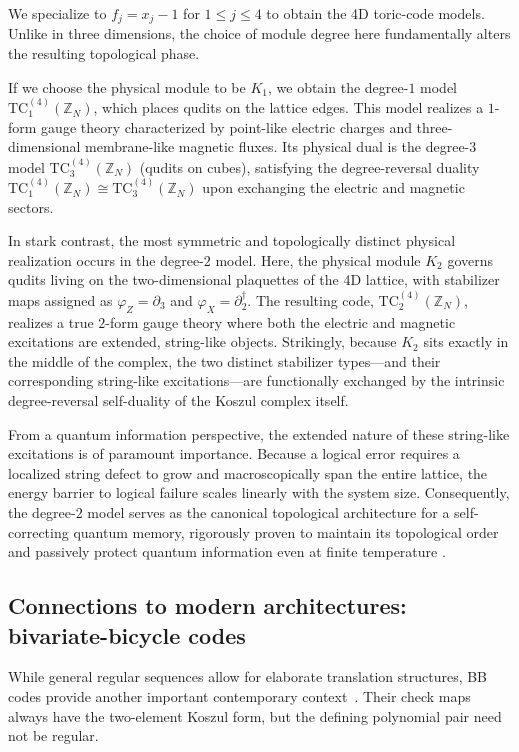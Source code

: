 \documentclass[aps,prx,english,superscriptaddress,twocolumn,tightenlines,showpacs,longbibliography,floatfix,amsfonts]{revtex4-2}
\theoremstyle{remark}
\theoremstyle{definition}
\begin{document}
We specialize to $f_j=x_j-1$ for $1\le j\le 4$ to obtain the 4D toric-code models. Unlike in three dimensions, the choice of module degree here fundamentally alters the resulting topological phase.

If we choose the physical module to be $K_1$, we obtain the degree-$1$ model $\mathrm{TC}_1^{(4)}(\mathbb{Z}_N)$, which places qudits on the lattice edges. This model realizes a $1$-form gauge theory characterized by point-like electric charges and three-dimensional membrane-like magnetic fluxes. Its physical dual is the degree-$3$ model $\mathrm{TC}_3^{(4)}(\mathbb{Z}_N)$ (qudits on cubes), satisfying the degree-reversal duality $\mathrm{TC}_1^{(4)}(\mathbb{Z}_N)\cong \mathrm{TC}_3^{(4)}(\mathbb{Z}_N)$ upon exchanging the electric and magnetic sectors.

In stark contrast, the most symmetric and topologically distinct physical realization occurs in the degree-$2$ model. Here, the physical module $K_2$ governs qudits living on the two-dimensional plaquettes of the 4D lattice, with stabilizer maps assigned as $\varphi_Z=\partial_3$ and $\varphi_X=\partial_2^\dagger$. The resulting code, $\mathrm{TC}_2^{(4)}(\mathbb{Z}_N)$, realizes a true $2$-form gauge theory where both the electric and magnetic excitations are extended, string-like objects. Strikingly, because $K_2$ sits exactly in the middle of the complex, the two distinct stabilizer types—and their corresponding string-like excitations—are functionally exchanged by the intrinsic degree-reversal self-duality of the Koszul complex itself.

From a quantum information perspective, the extended nature of these string-like excitations is of paramount importance. Because a logical error requires a localized string defect to grow and macroscopically span the entire lattice, the energy barrier to logical failure scales linearly with the system size. Consequently, the degree-$2$ model serves as the canonical topological architecture for a self-correcting quantum memory, rigorously proven to maintain its topological order and passively protect quantum information even at finite temperature \cite{dennis2002topological, hastings2011topological, brown2016quantum}.

\subsection{Connections to modern architectures: bivariate-bicycle codes}

While general regular sequences allow for elaborate translation structures,
BB codes provide another important contemporary context~\cite{Bravyi2024BB}.
Their check maps always have the two-element Koszul form, but the defining
polynomial pair need not be regular.
\end{document}

